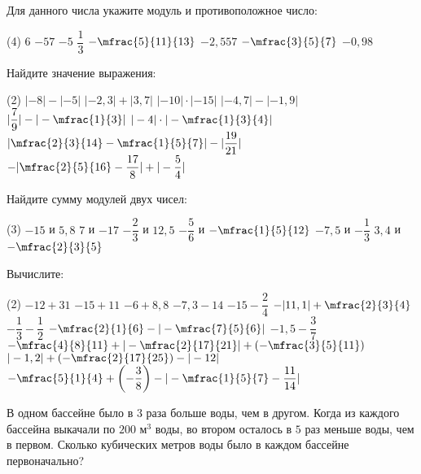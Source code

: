 \begin{class}[number=4]
	\begin{listofex}
		\item Для данного числа укажите модуль и противоположное число:
		\begin{tasks}(4)
			\task \( 6 \)
			\task \( -57 \)
			\task \( -5 \)
			\task \( \dfrac{1}{3} \)
			\task \( -\mfrac{5}{11}{13} \)
			\task \( -2,557 \)
			\task \( -\mfrac{3}{5}{7} \)
			\task \( -0,98 \)
		\end{tasks}
		\item Найдите значение выражения:
		\begin{tasks}(2)
			\task \( |-8|-|-5| \)
			\task \( |-2,3|+|3,7|  \)
			\task \(  |-10|\cdot|-15| \)
			\task \( |-4,7|-|-1,9| \)
			\task \( |\dfrac{7}{9}|-|-\mfrac{1}{3}| \)
			\task \( |-4|\cdot|-\mfrac{1}{3}{4}| \)
			\task \( |\mfrac{2}{3}{14}-\mfrac{1}{5}{7}|-|\dfrac{19}{21}| \)
			\task \( -|\mfrac{2}{5}{16}-\dfrac{17}{8}|+|-\dfrac{5}{4}| \)
		\end{tasks}
		\item Найдите сумму модулей двух чисел:
		\begin{tasks}(3)
			\task \( -15 \) и \( 5,8 \)
			\task \( 7 \) и \( -17 \)
			\task \( -\dfrac{2}{3} \) и \( 12,5 \)
			\task \( -\dfrac{5}{6} \) и \( -\mfrac{1}{5}{12} \)
			\task \( -7,5 \) и \( -\dfrac{1}{3} \)
			\task \( 3,4 \) и \( -\mfrac{2}{3}{5} \)
		\end{tasks}
		\item Вычислите:
		\begin{tasks}(2)
			\task \( -12 + 31 \)
			\task \( -15+11 \)
			\task \( -6+8,8 \)
			\task \( -7,3-14 \)
			\task \( -15-\dfrac{2}{4} \)
			\task \( -|11,1|+\mfrac{2}{3}{4} \)
			\task \( -\dfrac{1}{3}-\dfrac{1}{2} \)
			\task \( -\mfrac{2}{1}{6}-|-\mfrac{7}{5}{6}| \)
			\task \( -1,5-\dfrac{3}{7} \)
			\task \( -\mfrac{4}{8}{11}+|-\mfrac{2}{17}{21}|+\left(-\mfrac{3}{5}{11}\right) \)
			\task \( |-1,2| + \left(-\mfrac{2}{17}{25}\right) - |-12| \)
			\task \( -\mfrac{5}{1}{4} + \left(-\dfrac{3}{8}\right) - |-\mfrac{1}{5}{7}-\dfrac{11}{14}| \)
		\end{tasks}
		\item В одном бассейне было в \(3\) раза больше воды, чем в другом. Когда из каждого бассейна выкачали по \(200\) м\(^3\) воды, во втором осталось в \(5\) раз меньше воды, чем в первом. Сколько кубических метров воды было в каждом бассейне первоначально?
	\end{listofex}
\end{class}

